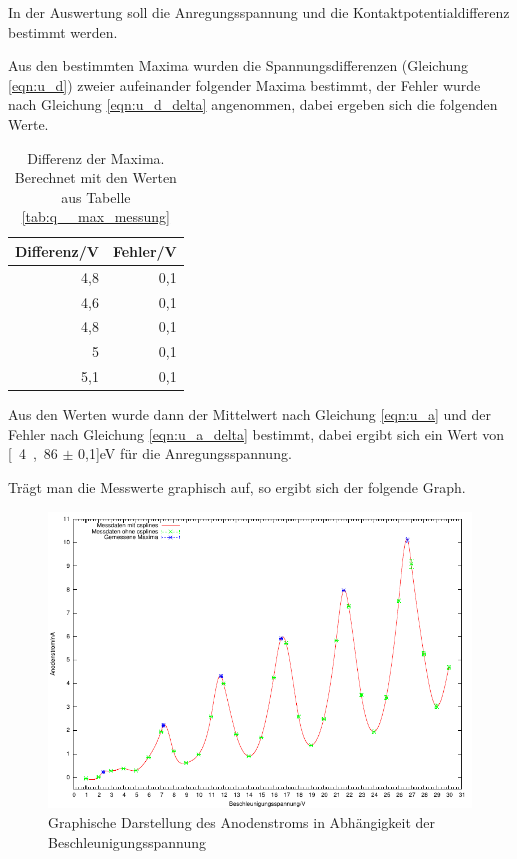 \documentclass[12pt,a4paper]{article}
\begin{document}
In der Auswertung soll die Anregungsspannung und die Kontaktpotentialdifferenz bestimmt werden.

Aus den bestimmten Maxima wurden die Spannungsdifferenzen (Gleichung \ref{eqn:u_d}) zweier aufeinander folgender Maxima bestimmt, der Fehler wurde nach Gleichung \ref{eqn:u_d_delta} angenommen, dabei ergeben sich die folgenden Werte.

\begin{table}[H]
\caption{Differenz der Maxima. Berechnet mit den Werten aus Tabelle \ref{tab:q__max_messung} }
\begin{center}
\begin{tabular}{|r|r|}
\hline
\multicolumn{1}{|l|}{Differenz/V} & \multicolumn{1}{l|}{Fehler/V} \\ \hline
4,8 & 0,1 \\ \hline
4,6 & 0,1 \\ \hline
4,8 & 0,1 \\ \hline
5 & 0,1 \\ \hline
5,1 & 0,1 \\ \hline
\end{tabular}
\end{center}
\label{tab:q__diff}
\end{table}

Aus den Werten wurde dann der Mittelwert nach Gleichung \ref{eqn:u_a} und der Fehler nach Gleichung \ref{eqn:u_a_delta} bestimmt, dabei ergibt sich ein Wert von \unit[4,86 $\pm$ 0,1]{eV} für die Anregungsspannung.

Trägt man die Messwerte graphisch auf, so ergibt sich der folgende Graph.

\begin{figure}[H]
	\centering
	\includegraphics[scale= 1.5]{q_t.pdf}
	\caption{Graphische Darstellung des Anodenstroms in Abhängigkeit der Beschleunigungsspannung}
\end{figure}
\end{document}
